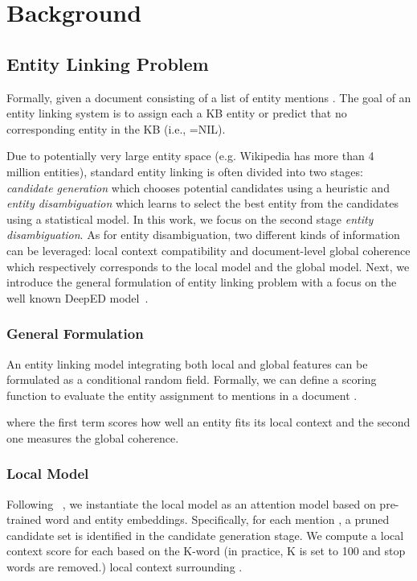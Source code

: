 \documentclass[letterpaper]{article} \usepackage{aaai20}  \usepackage{times}  \usepackage{helvet} \usepackage{courier}  \usepackage[hyphens]{url}  \usepackage{graphicx} \urlstyle{rm} \def\UrlFont{\rm}  \usepackage{graphicx}  \frenchspacing  \setlength{\pdfpagewidth}{8.5in}  \setlength{\pdfpageheight}{11in}  \usepackage{multirow}
\newcommand{\namecite}[1]{\citeauthor{#1}~\shortcite{#1}}
\begin{document}
\section{Background}
\subsection{Entity Linking Problem}
Formally, given a document  consisting of a list of entity mentions . The goal of an entity linking system is to assign each  a KB entity  or predict that no corresponding entity in the KB (i.e., =NIL).

Due to potentially very large entity space (e.g. Wikipedia has more than 4 million entities), standard entity linking is often divided into two stages: {\em candidate generation} which chooses potential candidates  using a heuristic and {\em entity disambiguation} which learns to select the best entity from the candidates using a statistical model. In this work, we focus on the second stage {\em entity disambiguation}. As for entity disambiguation, two different kinds of information can be leveraged: local context compatibility and document-level global coherence which respectively corresponds to the local model and the global model. Next, we introduce the general formulation of entity linking problem with a focus on the well known DeepED model~\cite{ganea2017deep}.

\subsubsection{General Formulation}
An entity linking model integrating both local and global features can be formulated as a conditional random field. Formally, we can define a scoring function  to evaluate the entity assignment  to mentions  in a document .

where the first term scores how well an entity fits its local context and the second one measures the global coherence.

\subsubsection{Local Model}
Following \namecite{ganea2017deep}, we instantiate the local model as an attention model based on pre-trained word and entity embeddings. Specifically, for each mention , a pruned candidate set  is identified in the candidate generation stage. We compute a local context score for each  based on the K-word (in practice, K is set to 100 and stop words are removed.) local context  surrounding . 
\end{document}
